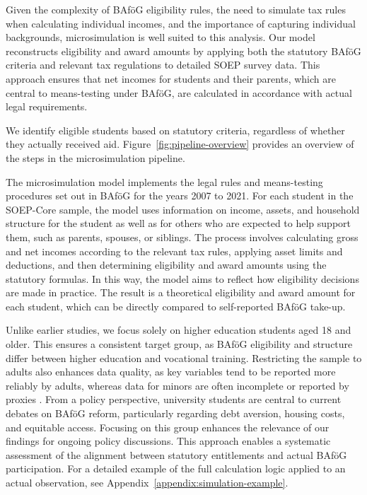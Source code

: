 Given the complexity of BAföG eligibility rules, the need to simulate tax rules when calculating individual incomes, and the importance of capturing individual backgrounds, microsimulation is well suited to this analysis. Our model reconstructs eligibility and award amounts by applying both the statutory BAföG criteria and relevant tax regulations to detailed SOEP survey data. This approach ensures that net incomes for students and their parents, which are central to means-testing under BAföG, are calculated in accordance with actual legal requirements.

We identify eligible students based on statutory criteria, regardless of whether they actually received aid. Figure~\ref{fig:pipeline-overview} provides an overview of the steps in the microsimulation pipeline.



The microsimulation model implements the legal rules and means-testing procedures set out in BAföG \citep{bafoeg_law} for the years 2007 to 2021. For each student in the SOEP-Core sample, the model uses information on income, assets, and household structure for the student as well as for others who are expected to help support them, such as parents, spouses, or siblings. The process involves calculating gross and net incomes according to the relevant tax rules, applying asset limits and deductions, and then determining eligibility and award amounts using the statutory formulas. In this way, the model aims to reflect how eligibility decisions are made in practice. The result is a theoretical eligibility and award amount for each student, which can be directly compared to self-reported BAföG take-up.

Unlike earlier studies, we focus solely on higher education students aged 18 and older. This ensures a consistent target group, as BAföG eligibility and structure differ between higher education and vocational training. 
Restricting the sample to adults also enhances data quality, as key variables tend to be reported more reliably by adults, whereas data for minors are often incomplete or reported by proxies \citep{soep_pgen_2025, soep_dtc_2005}.
From a policy perspective, university students are central to current debates on BAföG reform, particularly regarding debt aversion, housing costs, and equitable access. 
Focusing on this group enhances the relevance of our findings for ongoing policy discussions.
This approach enables a systematic assessment of the alignment between statutory entitlements and actual BAföG participation. 
For a detailed example of the full calculation logic applied to an actual observation, see Appendix~\ref{appendix:simulation-example}.

